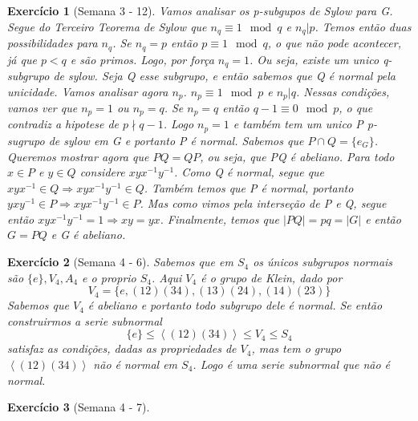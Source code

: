 \documentclass{article}
\newtheorem*{ex}{Exercício}
\begin{document}
\begin{ex}[Semana 3 - 12]
    Vamos analisar os p-subgupos de Sylow para G.
    Segue do Terceiro Teorema de Sylow que $n_q \equiv 1 \mod q$ e $n_q \vert p$.
    Temos então duas possibilidades para $n_q$.
    Se $n_q = p$ então $p \equiv 1 \mod q$, o que não pode acontecer, já que $p < q$ e são primos.
    Logo, por força $n_q = 1$. Ou seja, existe um unico q-subgrupo de sylow. 
    Seja Q esse subgrupo, e então sabemos que Q é normal pela unicidade.
    Vamos analisar agora $n_p$. 
    $n_p \equiv 1 \mod p$ e $n_p \vert q$.
    Nessas condições, vamos ver que $n_p = 1$ ou $n_p = q$.
    Se $n_p = q$ então $q - 1 \equiv 0 \mod p$, o que contradiz a hipotese de $p \nmid q-1$.
    Logo $n_p =1 $ e também tem um unico P p-sugrupo de sylow em G e portanto P é normal.
    Sabemos que $P \cap Q = \{e_G\}$.
    Queremos mostrar agora que $PQ = QP$, ou seja, que PQ é abeliano.
    Para todo $x \in P$ e $y \in Q$ considere $xyx^{-1}y^{-1}$.
    Como Q é normal, segue que $xyx^{-1} \in Q \Rightarrow xyx^{-1}y^{-1} \in Q$.
    Também temos que P é normal, portanto $yxy^{-1} \in P \Rightarrow xyx^{-1}y^{-1} \in P$.
    Mas como vimos pela interseção de P e Q, segue então $xyx^{-1}y^{-1} = 1 \Rightarrow xy = yx$.
    Finalmente, temos que $|PQ| = pq = |G|$ e então $G = PQ$ e G é abeliano.
\end{ex}

\begin{ex}[Semana 4 - 6]
    Sabemos que em $S_4$ os únicos subgrupos normais são $\{e\}, V_4, A_4$ e o proprio $S_4$.
    Aqui $V_4$ é o grupo de Klein, dado por
    \[V_4 = \{ e, (12)(34), (13)(24), (14)(23) \}\]
    Sabemos que $V_4$ é abeliano e portanto todo subgrupo dele é normal. 
    Se então construirmos a serie subnormal 
    \[\{e\} \leq \left\langle (12)(34)\right\rangle \leq V_4 \leq S_4 \] 
    satisfaz as condições, dadas as propriedades de $V_4$, mas tem o grupo $\left\langle (12)(34)\right\rangle$ não é normal em $S_4$.
    Logo é uma serie subnormal que não é normal.
\end{ex}

\begin{ex}[Semana 4 - 7]
    
\end{ex}
\end{document}
